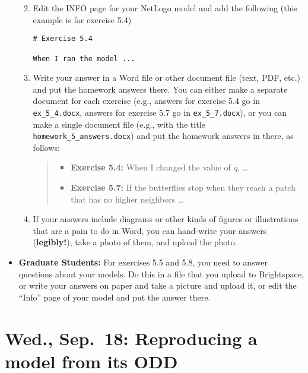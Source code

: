 \documentclass[
]{article}
\providecommand{\tightlist}{%
  \setlength{\itemsep}{0pt}\setlength{\parskip}{0pt}}
\begin{document}
\begin{itemize}
  \begin{enumerate}
  \def\labelenumi{\arabic{enumi}.}
  \item
    Edit the INFO page for your NetLogo model and add the following
    (this example is for exercise 5.4)

\begin{verbatim}
# Exercise 5.4

When I ran the model ...
\end{verbatim}
  \item
    Write your answer in a Word file or other document file (text, PDF,
    etc.) and put the homework answers there. You can either make a
    separate document for each exercise (e.g., answers for exercise 5.4
    go in \texttt{ex\_5\_4.docx}, answers for exercise 5.7 go in
    \texttt{ex\_5\_7.docx}), or you can make a single document file
    (e.g., with the title \texttt{homework\_5\_answers.docx}) and put
    the homework answers in there, as follows:

    \begin{quote}
    \begin{itemize}
    \tightlist
    \item
      \textbf{Exercise 5.4:} When I changed the value of \emph{q},
      \ldots{}
    \item
      \textbf{Exercise 5.7:} If the butterflies stop when they reach a
      patch that has no higher neighbors \ldots{}
    \end{itemize}
    \end{quote}
  \item
    If your answers include diagrams or other kinds of figures or
    illustrations that are a pain to do in Word, you can hand-write your
    answers (\textbf{legibly!}), take a photo of them, and upload the
    photo.
  \end{enumerate}
\item
  \textbf{Graduate Students:} For exercises 5.5 and 5.8, you need to
  answer questions about your models. Do this in a file that you upload
  to Brightspace, or write your answers on paper and take a picture and
  upload it, or edit the ``Info'' page of your model and put the answer
  there.
\end{itemize}

\section{Wed., Sep.~18: Reproducing a model from its
ODD}\label{wed.-sep.-18-reproducing-a-model-from-its-odd}
\end{document}
